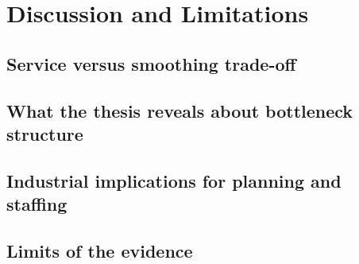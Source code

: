 \chapter{Discussion and Limitations}
\label{chap:discussion_limitations}


\section{Service versus smoothing trade-off}
%

\section{What the thesis reveals about bottleneck structure}
%

\section{Industrial implications for planning and staffing}
%

\section{Limits of the evidence}
%

